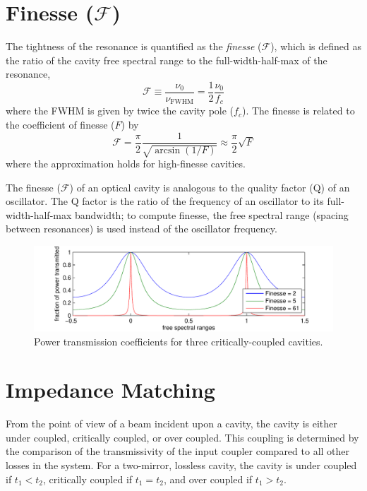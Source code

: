 \section{Finesse ($\mathcal{F}$)}
\label{sec:finesse}
The tightness of the resonance is quantified as the
\emph{finesse} ($\mathcal{F}$), which is defined as the ratio of the
cavity free spectral range to the full-width-half-max of the
resonance,
\begin{equation}
\mathcal{F} \equiv \frac{\nu_0}{\nu_{\mathrm{FWHM}}}
= \frac{1}{2}\frac{\nu_0}{f_c}
\end{equation}
%
where the FWHM is given by twice the cavity pole ($f_c$).  The finesse is related to the coefficient of finesse ($F$) by
%
\begin{equation}
\mathcal{F} = \frac{\pi}{2} \frac{1}{{\sqrt{\arcsin (1/F)}}} \approx \frac{\pi}{2}\sqrt{F}
\end{equation}where the approximation holds for high-finesse cavities.

The finesse ($\mathcal{F}$) of an optical cavity is analogous to
the quality factor (Q) of an oscillator. The Q factor is the ratio
of the frequency of an oscillator to its full-width-half-max bandwidth;
to compute finesse, the free spectral range (spacing between resonances)
is used instead of the oscillator frequency.

\begin{figure}
\begin{centering}
\includegraphics{figures/finesses}
\end{centering}
\caption[Cavity buildup versus detuning]{Power transmission coefficients for three critically-coupled cavities.}
\end{figure}

\section{Impedance Matching}

From the point of view of a beam incident upon a cavity, the cavity is
either under coupled, critically coupled, or over coupled. This
coupling is determined by the comparison of the transmissivity of the
input coupler compared to all other losses in the system. For a
two-mirror, lossless cavity, the cavity is under coupled if $t_1 <
t_2$, critically coupled if $t_1 = t_2$, and over coupled if $t_1 >
t_2$.

